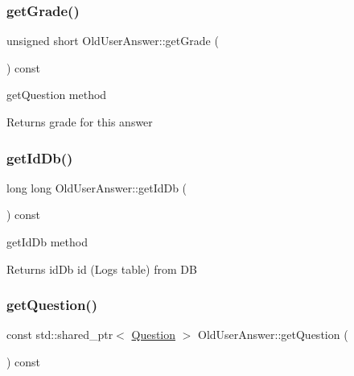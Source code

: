 \subsubsection{\texorpdfstring{get\+Grade()}{getGrade()}}
{\footnotesize\ttfamily unsigned short Old\+User\+Answer\+::get\+Grade (\begin{DoxyParamCaption}{ }\end{DoxyParamCaption}) const}



get\+Question method 

\begin{DoxyReturn}{Returns}
grade for this answer 
\end{DoxyReturn}
\mbox{\label{class_old_user_answer_a73670422ab34dd57ee78846c08f48ed3}} 
\subsubsection{\texorpdfstring{get\+Id\+Db()}{getIdDb()}}
{\footnotesize\ttfamily long long Old\+User\+Answer\+::get\+Id\+Db (\begin{DoxyParamCaption}{ }\end{DoxyParamCaption}) const}



get\+Id\+Db method 

\begin{DoxyReturn}{Returns}
id\+Db id (Logs table) from DB 
\end{DoxyReturn}
\mbox{\label{class_old_user_answer_a392760df6f3609a2d8a70b073135d1f0}} 
\subsubsection{\texorpdfstring{get\+Question()}{getQuestion()}}
{\footnotesize\ttfamily const std\+::shared\+\_\+ptr$<$ \hyperlink{class_question}{Question} $>$ Old\+User\+Answer\+::get\+Question (\begin{DoxyParamCaption}{ }\end{DoxyParamCaption}) const}



